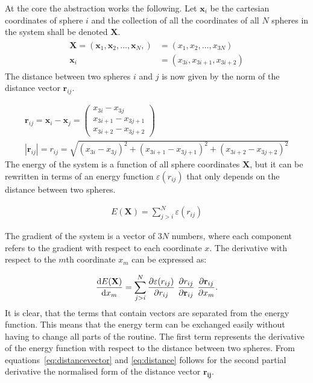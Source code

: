 At the core the abstraction works the following. Let $\mathbf{x}_i$ be the
cartesian coordinates of sphere $i$ and the collection of all the coordinates
of all $N$ spheres in the system shall be denoted $\mathbf{X}$.
%
\begin{align}
    \begin{aligned}
        \mathbf{X}=(\mathbf{x}_1,\mathbf{x}_2,\ldots,\mathbf{x}_N,)&=(x_1,x_2,\ldots,x_{3N}) \\
            \mathbf{x}_i &= (x_{3i},x_{3i+1},x_{3i+2})
    \end{aligned}
\end{align}%
%
The distance between two spheres $i$ and $j$ is now given by the norm of the
distance vector $\mathbf{r}_{ij}$.

\begin{align}
    \mathbf{r}_{ij}=\mathbf{x}_i-\mathbf{x}_j=
    \begin{pmatrix}
        x_{3i} - x_{3j}\\
        x_{3i+1} - x_{3j+1}\\
        x_{3i+2} - x_{3j+2}
    \end{pmatrix}\label{eq:distancevector}\\
    |\mathbf{r}_{ij}|=r_{ij}=\sqrt{(x_{3i} - x_{3j})^2 + (x_{3i+1} - x_{3j+1})^2 + (x_{3i+2} - x_{3j+2})^2}\label{eq:distance}
\end{align}
%
The energy of the system is a function of all sphere coordinates $\mathbf{X}$,
but it can be rewritten in terms of an energy function $\varepsilon(r_{ij})$ that only depends on the
distance between two spheres.

\begin{align}
    E(\mathbf{X})=\sum_{j>i}^N\varepsilon(r_{ij})
\end{align}%
%

The gradient of the system is a vector of $3N$ numbers, where each component
refers to the gradient with respect to each coordinate $x$. The derivative with
respect to the $m$th coordinate $x_m$ can be expressed as:

\begin{align}
    \dv{E(\mathbf{X})}{x_m}=\sum_{j>i}^N\pdv{\varepsilon(r_{ij})}{r_{ij}}\ \pdv{r_{ij}}{\mathbf{r}_{ij}}\ \pdv{\mathbf{r}_{ij}}{x_m}.\label{eq:gradientcomponent}
\end{align}%
%
It is clear, that the terms that contain vectors are separated from the energy
function. This means that the energy term can be exchanged easily without
having to change all parts of the routine. The first term represents the
derivative of the energy function with respect to the distance between two
spheres. From equations~\eqref{eq:distancevector} and \eqref{eq:distance}
follows for the second partial derivative the normalised form of the distance
vector $\mathbf{r_{ij}}$.

